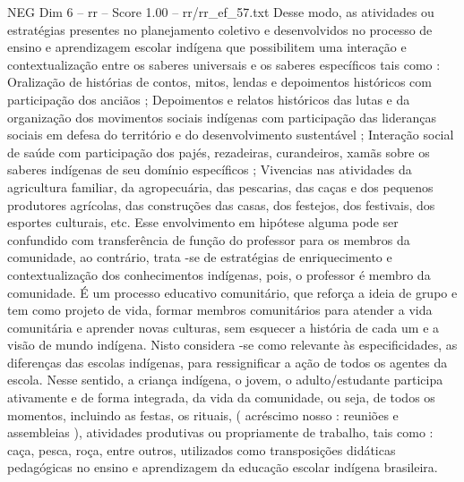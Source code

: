 \begin{textsample}{NEG Dim 6 – rr – Score 1.00 – rr/rr\_ef\_57.txt}
Desse modo, as atividades ou estratégias presentes no planejamento coletivo e desenvolvidos no processo de ensino e aprendizagem escolar indígena que possibilitem uma interação e contextualização entre os saberes universais e os saberes específicos tais como : Oralização de histórias de contos, mitos, lendas e depoimentos históricos com participação dos anciãos ; Depoimentos e relatos históricos das lutas e da organização dos movimentos sociais indígenas com participação das lideranças sociais em defesa do território e do desenvolvimento sustentável ; Interação social de saúde com participação dos pajés, rezadeiras, curandeiros, xamãs sobre os saberes indígenas de seu domínio específicos ; Vivencias nas atividades da agricultura familiar, da agropecuária, das pescarias, das caças e dos pequenos produtores agrícolas, das construções das casas, dos festejos, dos festivais, dos esportes culturais, etc.
Esse envolvimento em hipótese alguma pode ser confundido com transferência de função do professor para os membros da comunidade, ao contrário, trata -se de estratégias de enriquecimento e contextualização dos conhecimentos indígenas, pois, o professor é membro da comunidade.
É um processo educativo comunitário, que reforça a ideia de grupo e tem como projeto de vida, formar membros comunitários para atender a vida comunitária e aprender novas culturas, sem esquecer a história de cada um e a visão de mundo indígena.
Nisto considera -se como relevante às especificidades, as diferenças das escolas indígenas, para ressignificar a ação de todos os agentes da escola.
Nesse sentido, a criança indígena, o jovem, o adulto/estudante participa ativamente e de forma integrada, da vida da comunidade, ou seja, de todos os momentos, incluindo as festas, os rituais, ( acréscimo nosso : reuniões e assembleias ), atividades produtivas ou propriamente de trabalho, tais como : caça, pesca, roça, entre outros, utilizados como transposições didáticas pedagógicas no ensino e aprendizagem da educação escolar indígena brasileira.

\end{textsample}
